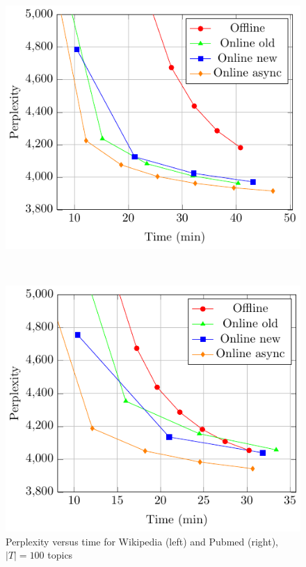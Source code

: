 \documentclass[russian,english]{llncs}
\begin{document}
\begin{figure}[t]
	\centering
	\begin{minipage}[b]{0.4\textwidth}
		\includegraphics[scale=0.65]{plots/perplexity_time_plot_12.pdf}
	\end{minipage}
	$\qquad\quad$
	\begin{minipage}[b]{0.4\textwidth}
		\includegraphics[scale=0.65]{plots/perplexity_time_plot_16.pdf}
	\end{minipage}
	\caption{Perplexity versus time for Wikipedia (left) and Pubmed (right), $|T| = 100$ topics}
	\label{fig:perf}
\end{figure}
\end{document}
